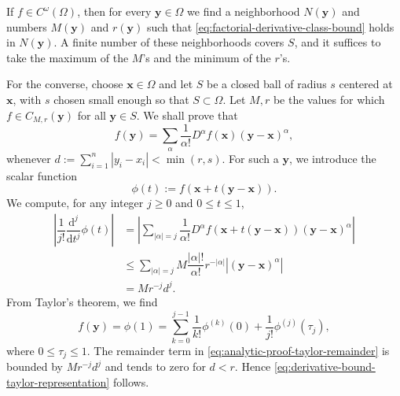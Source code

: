 \begin{Proof}
If $f\in C^\omega(\Omega)$, then for every $\bm{y}\in\Omega$ we find a neighborhood $N(\bm{y})$ and numbers $M(\bm{y})$ and $r(\bm{y})$ such that \eqref{eq:factorial-derivative-class-bound} holds in $N(\bm{y})$. A finite number of these neighborhoods covers $S$, and it suffices to take the maximum of the $M$'s and the minimum of the $r$'s.

For the converse, choose $\bm{x}\in\Omega$ and let $S$ be a closed ball of radius $s$ centered at $\bm{x}$, with $s$ chosen small enough so that $S\subset\Omega$. Let $M,r$ be the values for which $f\in C_{M,r}(\bm{y})$ for all $\bm{y}\in S$. We shall prove that
\begin{equation}\label{eq:derivative-bound-taylor-representation}
f(\bm{y})=\sum_\alpha\dfrac1{\alpha!}D^\alpha f(\bm{x})(\bm{y}-\bm{x})^\alpha,
\end{equation}
whenever $d:=\sum_{i=1}^n|y_i-x_i|<\min(r,s)$. For such a $\bm{y}$, we introduce the scalar function
\begin{equation}\label{eq:analytic-proof-line-segment-function}
\phi(t):=f(\bm{x}+t(\bm{y}-\bm{x})).
\end{equation}
We compute, for any integer $j\geq0$ and $0\leq t\leq1$,
\[
\begin{aligned}
\left|\dfrac1{j!}\dfrac{\mathrm{d}^j}{\mathrm{d}t^j}\phi(t)\right|
&=\left|\sum_{|\alpha|=j}\dfrac1{\alpha!}D^\alpha f(\bm{x}+t(\bm{y}-\bm{x}))(\bm{y}-\bm{x})^\alpha\right|\\
&\leq\sum_{|\alpha|=j}M\dfrac{|\alpha|!}{\alpha!}r^{-|\alpha|}|(\bm{y}-\bm{x})^\alpha|\\
&=Mr^{-j}d^j.
\end{aligned}
\]
From Taylor's theorem, we find
\begin{equation}\label{eq:analytic-proof-taylor-remainder}
f(\bm{y})=\phi(1)=\sum_{k=0}^{j-1}\dfrac1{k!}\phi^{(k)}(0)+\dfrac1{j!}\phi^{(j)}(\tau_j),
\end{equation}
where $0\leq\tau_j\leq1$. The remainder term in \eqref{eq:analytic-proof-taylor-remainder} is bounded by $Mr^{-j}d^j$ and tends to zero for $d<r$. Hence \eqref{eq:derivative-bound-taylor-representation} follows.
\end{Proof}

